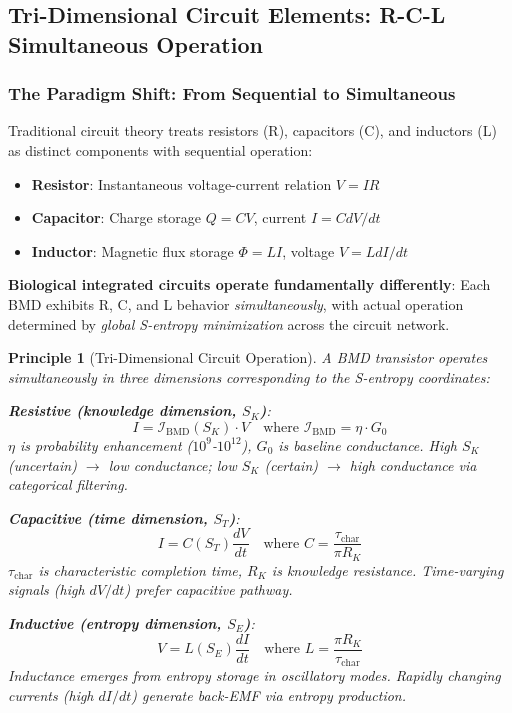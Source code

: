 \documentclass[11pt,a4paper]{article}
\newtheorem{principle}{Principle}[section]
\begin{document}
\subsection{Tri-Dimensional Circuit Elements: R-C-L Simultaneous Operation}

\subsubsection{The Paradigm Shift: From Sequential to Simultaneous}

Traditional circuit theory treats resistors (R), capacitors (C), and inductors (L) as distinct components with sequential operation:
\begin{itemize}
\item \textbf{Resistor}: Instantaneous voltage-current relation $V = IR$
\item \textbf{Capacitor}: Charge storage $Q = CV$, current $I = C dV/dt$
\item \textbf{Inductor}: Magnetic flux storage $\Phi = LI$, voltage $V = L dI/dt$
\end{itemize}

\textbf{Biological integrated circuits operate fundamentally differently}: Each BMD exhibits R, C, and L behavior \textit{simultaneously}, with actual operation determined by \textit{global S-entropy minimization} across the circuit network.

\begin{principle}[Tri-Dimensional Circuit Operation]
\label{prin:tri_dimensional}
A BMD transistor operates simultaneously in three dimensions corresponding to the S-entropy coordinates:

\textbf{Resistive (knowledge dimension, $S_K$)}:
\begin{equation}
I = \mathcal{I}_{\text{BMD}}(S_K) \cdot V \quad \text{where } \mathcal{I}_{\text{BMD}} = \eta \cdot G_0
\end{equation}
$\eta$ is probability enhancement ($10^9$-$10^{12}$), $G_0$ is baseline conductance. High $S_K$ (uncertain) $\to$ low conductance; low $S_K$ (certain) $\to$ high conductance via categorical filtering.

\textbf{Capacitive (time dimension, $S_T$)}:
\begin{equation}
I = C(S_T) \frac{dV}{dt} \quad \text{where } C = \frac{\tau_{\text{char}}}{\pi R_K}
\end{equation}
$\tau_{\text{char}}$ is characteristic completion time, $R_K$ is knowledge resistance. Time-varying signals (high $dV/dt$) prefer capacitive pathway.

\textbf{Inductive (entropy dimension, $S_E$)}:
\begin{equation}
V = L(S_E) \frac{dI}{dt} \quad \text{where } L = \frac{\pi R_K}{\tau_{\text{char}}}
\end{equation}
Inductance emerges from entropy storage in oscillatory modes. Rapidly changing currents (high $dI/dt$) generate back-EMF via entropy production.
\end{principle}
\end{document}
